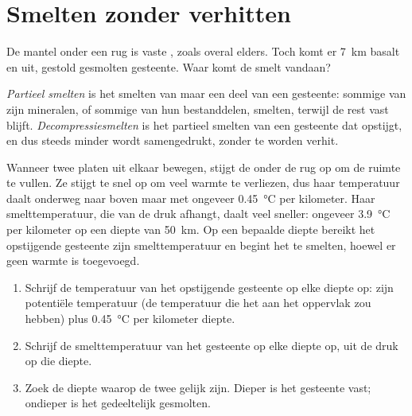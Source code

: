 \section{Smelten zonder verhitten}

De mantel onder een rug is vaste , zoals overal elders. Toch komt er
\qty{7}{km} basalt en  uit, gestold gesmolten gesteente. Waar
komt de smelt vandaan?

\begin{definition}\label{def:g11:ocean-ridges:partial-melting}
\emph{Partieel smelten} is het smelten van maar een deel
van een gesteente: sommige van zijn mineralen, of sommige van hun bestanddelen,
smelten, terwijl de rest vast blijft.
\emph{Decompressiesmelten} is het partieel smelten van een gesteente dat opstijgt, en dus steeds
minder wordt samengedrukt, zonder te worden verhit.
\end{definition}

Wanneer twee platen uit elkaar bewegen, stijgt de  onder de rug op om de
ruimte te vullen. Ze stijgt te snel op om veel warmte te verliezen, dus haar
temperatuur daalt onderweg naar boven maar met ongeveer \qty{0.45}{\celsius} per
kilometer. Haar smelttemperatuur, die van de druk afhangt, daalt veel sneller:
ongeveer \qty{3.9}{\celsius} per kilometer op een diepte van \qty{50}{km}. Op een
bepaalde diepte bereikt het opstijgende gesteente zijn smelttemperatuur en begint
het te smelten, hoewel er geen warmte is toegevoegd.

\begin{method}\label{met:g11:ocean-ridges:melting}
\begin{enumerate}
  \item Schrijf de temperatuur van het opstijgende gesteente op elke diepte op: zijn
        potentiële temperatuur (de temperatuur die het aan het oppervlak zou hebben)
        plus \qty{0.45}{\celsius} per kilometer diepte.
  \item Schrijf de smelttemperatuur van het gesteente op elke diepte op, uit de
        druk op die diepte.
  \item Zoek de diepte waarop de twee gelijk zijn. Dieper is het gesteente vast;
        ondieper is het gedeeltelijk gesmolten.
\end{enumerate}
\end{method}

